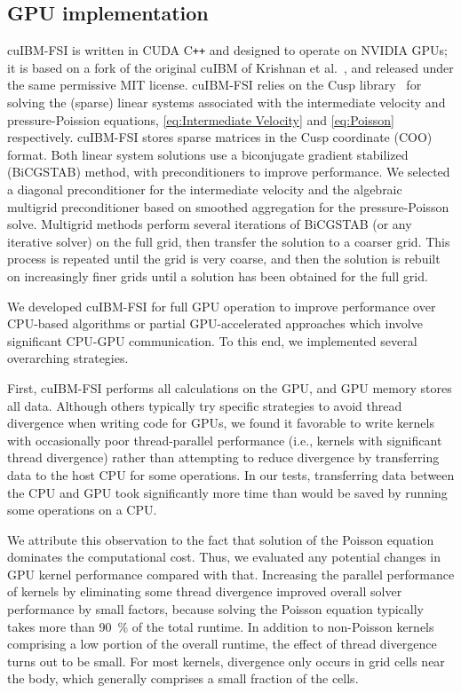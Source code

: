 \documentclass[preprint,12pt]{elsarticle}
\begin{document}
\subsection{GPU implementation}
\label{sec:GPU-implementation}
%
cuIBM-FSI is written in CUDA C\texttt{++} and designed to operate on NVIDIA GPUs; it is based on
a fork of the original cuIBM of Krishnan et al.~\cite{Krishnan2017}, and released
under the same permissive MIT license.
cuIBM-FSI relies on the Cusp library~\cite{Cusp} for solving the (sparse) linear systems associated with the intermediate velocity and pressure-Poission equations, \eqref{eq:Intermediate Velocity} and \eqref{eq:Poisson} respectively.
cuIBM-FSI stores sparse matrices in the Cusp coordinate (COO) format.
Both linear system solutions use a biconjugate gradient stabilized (BiCGSTAB) method,
with preconditioners to improve performance. We selected a diagonal preconditioner
for the intermediate velocity and the algebraic multigrid preconditioner based on
smoothed aggregation for the pressure-Poisson solve.
Multigrid methods perform several iterations of BiCGSTAB (or any iterative solver)
on the full grid, then transfer the solution to a coarser grid. This process is
repeated until the grid is very coarse, and then the solution is rebuilt on
increasingly finer grids until a solution has been obtained for the full grid.

We developed cuIBM-FSI for full GPU operation to improve performance over CPU-based algorithms or partial GPU-accelerated approaches which involve significant CPU-GPU communication.
To this end, we implemented several overarching strategies.

First, cuIBM-FSI performs all calculations on the GPU, and GPU memory stores all data.
Although others typically try specific strategies to avoid thread divergence when writing code for GPUs, we found it favorable to write kernels with occasionally poor thread-parallel performance (i.e., kernels with significant thread divergence) rather than attempting to reduce divergence by transferring data to the host CPU for some operations.
In our tests, transferring data between the CPU and GPU took significantly more time than would be saved by running some operations on a CPU.

We attribute this observation to the fact that solution of the Poisson equation dominates the computational cost.
Thus, we evaluated any potential changes in GPU kernel performance compared with that.
Increasing the parallel performance of kernels by eliminating some thread divergence improved overall solver performance by small factors, because solving the Poisson equation typically takes more than \SI{90}{\percent} of the total runtime.
In addition to non-Poisson kernels comprising a low portion of the overall runtime, the effect of thread divergence turns out to be small.
For most kernels, divergence only occurs in grid cells near the body, which generally comprises a small fraction of the cells.
\end{document}
